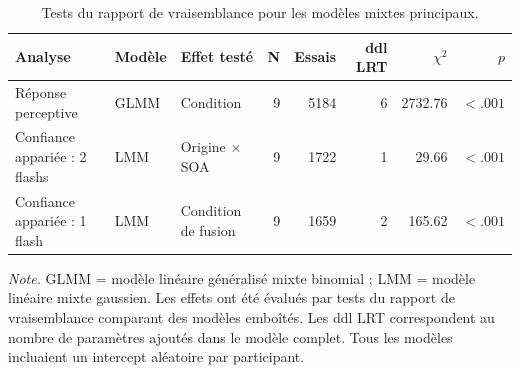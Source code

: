 \begin{table}[ht]
\centering
\caption{Tests du rapport de vraisemblance pour les modèles mixtes principaux.}
\label{tab:main_model_tests_v2}
\scriptsize
\begin{tabular}{p{4.4cm}p{1.3cm}p{3.5cm}rrrrr}
\toprule
Analyse & Modèle & Effet testé & N & Essais & ddl LRT & $\chi^2$ & $p$ \\
\midrule
Réponse perceptive & GLMM & Condition & 9 & 5184 & 6 & 2732.76 & $< .001$ \\
Confiance appariée : 2 flashs & LMM & Origine $\times$ SOA & 9 & 1722 & 1 & 29.66 & $< .001$ \\
Confiance appariée : 1 flash & LMM & Condition de fusion & 9 & 1659 & 2 & 165.62 & $< .001$ \\
\bottomrule
\end{tabular}

\vspace{0.2cm}
\begin{minipage}{0.96\textwidth}
\footnotesize
\textit{Note.} GLMM = modèle linéaire généralisé mixte binomial ; LMM = modèle linéaire mixte gaussien. Les effets ont été évalués par tests du rapport de vraisemblance comparant des modèles emboîtés. Les ddl LRT correspondent au nombre de paramètres ajoutés dans le modèle complet. Tous les modèles incluaient un intercept aléatoire par participant.
\end{minipage}
\end{table}
